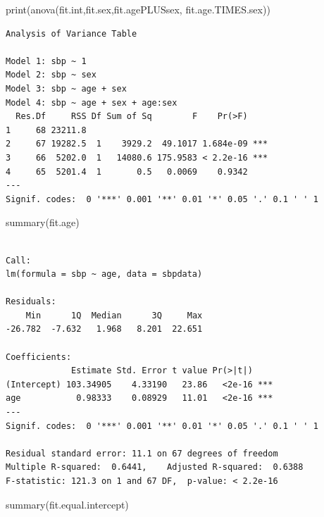 \documentclass[
  letterpaper,
]{scrbook}
\newenvironment{Shaded}{\begin{snugshade}}{\end{snugshade}}
\newcommand{\FunctionTok}[1]{\textcolor[rgb]{0.28,0.35,0.67}{#1}}
\newcommand{\NormalTok}[1]{\textcolor[rgb]{0.00,0.23,0.31}{#1}}
\begin{document}
\begin{Shaded}
\begin{Highlighting}[]
\FunctionTok{print}\NormalTok{(}\FunctionTok{anova}\NormalTok{(fit.int,fit.sex,fit.agePLUSsex, fit.age.TIMES.sex))}
\end{Highlighting}
\end{Shaded}

\begin{verbatim}
Analysis of Variance Table

Model 1: sbp ~ 1
Model 2: sbp ~ sex
Model 3: sbp ~ age + sex
Model 4: sbp ~ age + sex + age:sex
  Res.Df     RSS Df Sum of Sq        F    Pr(>F)    
1     68 23211.8                                    
2     67 19282.5  1    3929.2  49.1017 1.684e-09 ***
3     66  5202.0  1   14080.6 175.9583 < 2.2e-16 ***
4     65  5201.4  1       0.5   0.0069    0.9342    
---
Signif. codes:  0 '***' 0.001 '**' 0.01 '*' 0.05 '.' 0.1 ' ' 1
\end{verbatim}

\begin{Shaded}
\begin{Highlighting}[]
\FunctionTok{summary}\NormalTok{(fit.age)}
\end{Highlighting}
\end{Shaded}

\begin{verbatim}

Call:
lm(formula = sbp ~ age, data = sbpdata)

Residuals:
    Min      1Q  Median      3Q     Max 
-26.782  -7.632   1.968   8.201  22.651 

Coefficients:
             Estimate Std. Error t value Pr(>|t|)    
(Intercept) 103.34905    4.33190   23.86   <2e-16 ***
age           0.98333    0.08929   11.01   <2e-16 ***
---
Signif. codes:  0 '***' 0.001 '**' 0.01 '*' 0.05 '.' 0.1 ' ' 1

Residual standard error: 11.1 on 67 degrees of freedom
Multiple R-squared:  0.6441,    Adjusted R-squared:  0.6388 
F-statistic: 121.3 on 1 and 67 DF,  p-value: < 2.2e-16
\end{verbatim}

\begin{Shaded}
\begin{Highlighting}[]
\FunctionTok{summary}\NormalTok{(fit.equal.intercept)}
\end{Highlighting}
\end{Shaded}
\end{document}
